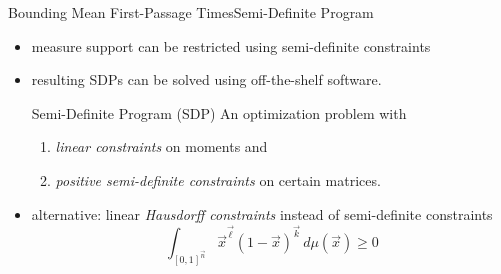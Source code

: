 \documentclass[10pt]{beamer}
\newcommand{\bottomcite}[1]{\vspace*{\fill} {\scriptsize \parencite{#1}}}
\begin{document}
\begin{frame}{Bounding Mean First-Passage Times}{Semi-Definite Program}
  \begin{itemize}
    \item measure support can be restricted using semi-definite constraints
    \item resulting SDPs can be solved using off-the-shelf software.
    \begin{block}{Semi-Definite Program (SDP)}
        An optimization problem with
        \begin{enumerate}
            \item \emph{linear constraints} on moments and
            \item \emph{positive semi-definite constraints} on certain matrices.
        \end{enumerate}
    \end{block}
    \item alternative: linear \emph{Hausdorff constraints} instead of semi-definite constraints
        \[\int_{[0,1]^{\vec n}}{\vec x}^{\vec\ell}{(1-\vec x)}^{\vec k}\,d\mu(\vec x)\geq 0\]
  \end{itemize}
\bottomcite{backenkohler2019bounding}
\end{frame}
\end{document}
